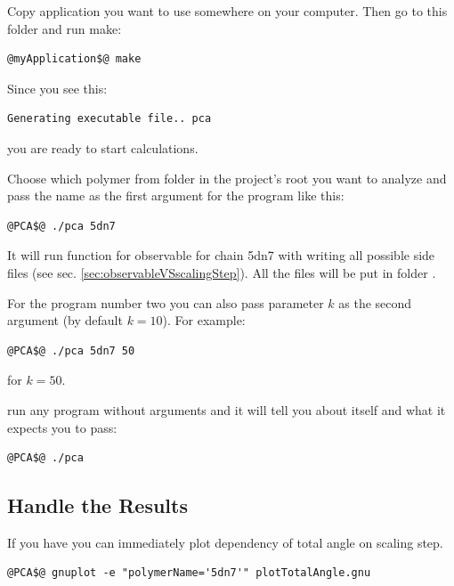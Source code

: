 \documentclass[12pt]{article}
\begin{document}
\begin{mySection}
Copy application you want to use somewhere on your computer. Then go to this folder and run make:
\begin{lstlisting}
@myApplication$@ make
\end{lstlisting}
Since you see this:
\begin{lstlisting}
Generating executable file.. pca
\end{lstlisting}
you are ready to start calculations.

Choose which polymer from folder  in the project's root you want to analyze and pass the name as the first argument for the program like this:
\begin{lstlisting}
@PCA$@ ./pca 5dn7
\end{lstlisting}
It will run function  for observable  for chain 5dn7 with writing all possible side files (see sec. \ref{sec:observableVSscalingStep}). All the files will be put in folder .

For the program number two you can also pass parameter $k$ as the second argument (by default $k=10$). For example:
\begin{lstlisting}
@PCA$@ ./pca 5dn7 50
\end{lstlisting}
for $k=50$.

\hint run any program without arguments and it will tell you about itself and what it expects you to pass:
\begin{lstlisting}
@PCA$@ ./pca
\end{lstlisting}

\subsection{Handle the Results}
If you have  you can immediately plot dependency of total angle on scaling step.
\begin{lstlisting}
@PCA$@ gnuplot -e "polymerName='5dn7'" plotTotalAngle.gnu 
\end{lstlisting}

\end{mySection}
\end{document}
